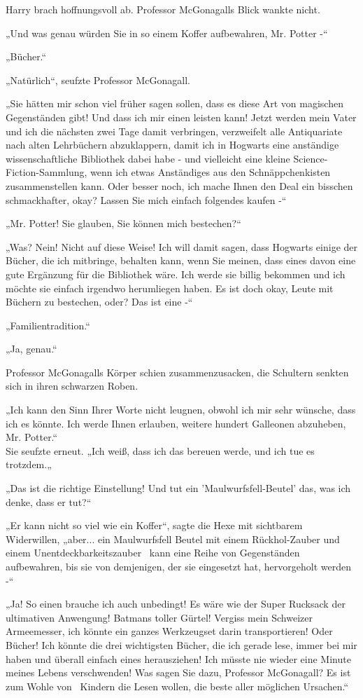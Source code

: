 {Harry brach hoffnungsvoll ab. Professor McGonagalls Blick wankte nicht.

„Und was genau würden Sie in so einem Koffer aufbewahren, Mr. Potter -“

„Bücher.“

„Natürlich“, seufzte Professor McGonagall.

„Sie hätten mir schon viel früher sagen sollen, dass es diese Art von magischen Gegenständen gibt! Und dass ich mir einen leisten kann! Jetzt werden mein Vater und ich die nächsten zwei Tage damit verbringen, verzweifelt alle Antiquariate nach alten Lehrbüchern abzuklappern, damit ich in Hogwarts eine anständige wissenschaftliche Bibliothek dabei habe - und vielleicht eine kleine Science-Fiction-Sammlung, wenn ich etwas Anständiges aus den Schnäppchenkisten zusammenstellen kann. Oder besser noch, ich mache Ihnen den Deal ein bisschen schmackhafter, okay? Lassen Sie mich einfach folgendes kaufen -“

„Mr. Potter! Sie glauben, Sie können mich bestechen?“

„Was? Nein! Nicht auf diese Weise! Ich will damit sagen, dass Hogwarts einige der Bücher, die ich mitbringe, behalten kann, wenn Sie meinen, dass eines davon eine gute Ergänzung für die Bibliothek wäre. Ich werde sie billig bekommen und ich möchte sie einfach irgendwo herumliegen haben. Es ist doch okay, Leute mit Büchern zu bestechen, oder? Das ist eine -“

„Familientradition.“

„Ja, genau.“

Professor McGonagalls Körper schien zusammenzusacken, die Schultern senkten sich in ihren schwarzen Roben.

„Ich kann den Sinn Ihrer Worte nicht leugnen, obwohl ich mir sehr wünsche, dass ich es könnte. Ich werde Ihnen erlauben, weitere hundert Galleonen abzuheben, Mr. Potter.“\\ Sie seufzte erneut. „Ich weiß, dass ich das bereuen werde, und ich tue es trotzdem.„

„Das ist die richtige Einstellung! Und tut ein 'Maulwurfsfell-Beutel' das, was ich denke, dass er tut?“

„Er kann nicht so viel wie ein Koffer“, sagte die Hexe mit sichtbarem Widerwillen, „aber... ein Maulwurfsfell Beutel mit einem Rückhol-Zauber und einem Unentdeckbarkeitszauber ~kann eine Reihe von Gegenständen aufbewahren, bis sie von demjenigen, der sie eingesetzt hat, hervorgeholt werden -“

„Ja! So einen brauche ich auch unbedingt! Es wäre wie der Super Rucksack der ultimativen Anwengung! Batmans toller Gürtel! Vergiss mein Schweizer Armeemesser, ich könnte ein ganzes Werkzeugset darin transportieren! Oder Bücher! Ich könnte die drei wichtigsten Bücher, die ich gerade lese, immer bei mir haben und überall einfach eines herausziehen! Ich müsste nie wieder eine Minute meines Lebens verschwenden! Was sagen Sie dazu, Professor McGonagall? Es ist zum Wohle von ~Kindern die Lesen wollen, die beste aller möglichen Ursachen.“

}
